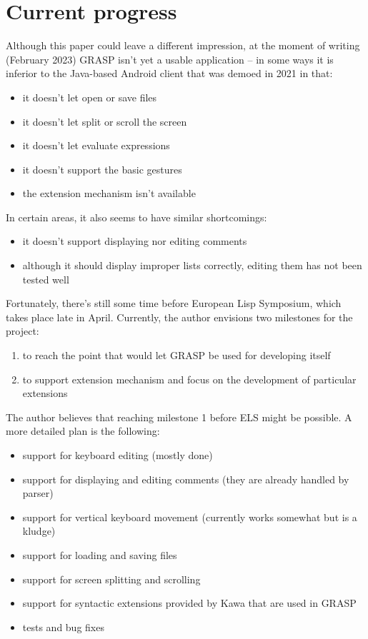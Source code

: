 \documentclass[sigconf]{acmart}
\begin{document}
\section{Current progress}

Although this paper could leave a different impression,
at the moment of writing (February 2023) GRASP isn't yet 
a usable application -- in some ways it is inferior to the
Java-based Android client that was demoed in 2021
in that:
\begin{itemize}
\item it doesn't let open or save files
\item it doesn't let split or scroll the screen
\item it doesn't let evaluate expressions
\item it doesn't support the basic gestures
\item the extension mechanism isn't available
\end{itemize}

In certain areas, it also seems to have similar
shortcomings:
\begin{itemize}
\item it doesn't support displaying nor editing
comments
\item although it should display improper lists correctly, 
editing them has not been tested well
\end{itemize}

Fortunately, there's still some time before
European Lisp Symposium, which takes place late
in April. Currently, the author envisions two
milestones for the project:
\begin{enumerate}
\item to reach the point that would let GRASP
be used for developing itself
\item to support extension mechanism and focus
on the development of particular extensions
\end{enumerate}

The author believes that reaching milestone 1
before ELS might be possible. A more detailed
plan is the following:
\begin{itemize}
\item support for keyboard editing (mostly done)
\item support for displaying and editing comments
(they are already handled by parser)
\item support for vertical keyboard movement
(currently works somewhat but is a kludge)
\item support for loading and saving files
\item support for screen splitting and scrolling
\item support for syntactic extensions provided
by Kawa that are used in GRASP
\item tests and bug fixes
\end{itemize}
\end{document}
